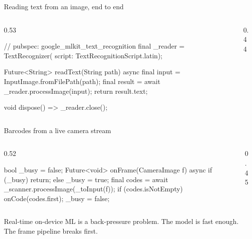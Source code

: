 \documentclass[10pt,aspectratio=169,t]{beamer}
\begin{document}
\begin{frame}[fragile,eyebrow=On-device ML]{Reading text from an image, end to end}
  \begin{columns}[T]
    \begin{column}{0.53\textwidth}
\begin{dart}
// pubspec: google_mlkit_text_recognition
final _reader = TextRecognizer(
    script: TextRecognitionScript.latin);

Future<String> readText(String path) async {
  final input = InputImage.fromFilePath(path);
  final result =
      await _reader.processImage(input);
  return result.text;
}

void dispose() => _reader.close();
\end{dart}
    \end{column}
    \begin{column}{0.44\textwidth}
      \vskip 2mm
      \vskip 2mm
    \end{column}
  \end{columns}
\end{frame}

\begin{frame}[fragile,eyebrow=On-device ML]{Barcodes from a live camera stream}
  \begin{columns}[T]
    \begin{column}{0.52\textwidth}
\begin{dart}
bool _busy = false;
Future<void> onFrame(CameraImage f) async {
  if (_busy) return; else _busy = true;
  final codes = await _scanner.processImage(_toInput(f));
  if (codes.isNotEmpty) onCode(codes.first);
  _busy = false;
}
\end{dart}
    \end{column}
    \begin{column}{0.45\textwidth}
    \end{column}
  \end{columns}
  \begin{takeaway}{Real-time on-device ML is a back-pressure problem.}
    The model is fast enough. The frame pipeline breaks first.
  \end{takeaway}
\end{frame}
\end{document}
